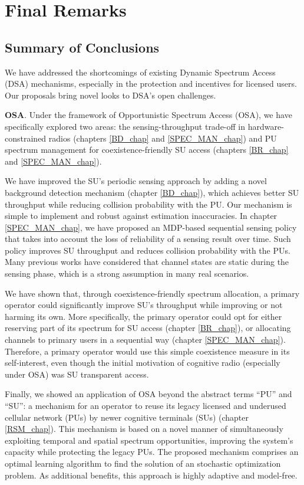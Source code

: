 \chapter{Final Remarks}\label{Conclusion_chap}

\section{Summary of Conclusions} %

We have addressed the shortcomings of existing Dynamic Spectrum Access (DSA) mechanisms, especially in the protection and incentives for licensed users. Our proposals bring novel looks to DSA's open challenges. 

\textbf{OSA}. Under the framework of Opportunistic Spectrum Access (OSA), we have specifically explored two areas: the sensing-throughput trade-off in hardware-constrained radios (chapters \ref{BD_chap} and \ref{SPEC_MAN_chap}) and PU spectrum management for coexistence-friendly SU access (chapters \ref{BR_chap} and \ref{SPEC_MAN_chap}). 

We have improved the SU's periodic sensing approach by adding a novel background detection mechanism (chapter \ref{BD_chap}), which achieves better SU throughput while reducing collision probability with the PU. Our mechanism is simple to implement and robust against estimation inaccuracies. In chapter \ref{SPEC_MAN_chap}, we have proposed an MDP-based sequential sensing policy that takes into account the loss of reliability of a sensing result over time. Such policy improves SU throughput and reduces collision probability with the PUs. Many previous works have considered that channel states are static during the sensing phase, which is a strong assumption in many real scenarios. 

We have shown that, through coexistence-friendly spectrum allocation, a primary operator could significantly improve SU's throughput while improving or not harming its own. More specifically, the primary operator could opt for either reserving part of its spectrum for SU access (chapter \ref{BR_chap}), or allocating channels to primary users in a sequential way (chapter \ref{SPEC_MAN_chap}). 
Therefore, a primary operator would use this simple coexistence measure in its self-interest, even though the initial motivation of cognitive radio (especially under OSA) was SU transparent access. 

Finally, we showed an application of OSA beyond the abstract terms \enquote{PU} and \enquote{SU}: a mechanism for an operator to reuse its legacy licensed and underused cellular network (PUs) by newer cognitive terminals (SUs) (chapter \ref{RSM_chap}). This mechanism is based on a novel manner of simultaneously exploiting temporal and spatial spectrum opportunities, improving the system's capacity while protecting the legacy PUs. The proposed mechanism comprises an optimal learning algorithm to find the solution of an stochastic optimization problem. As additional benefits, this approach is highly adaptive and model-free.

